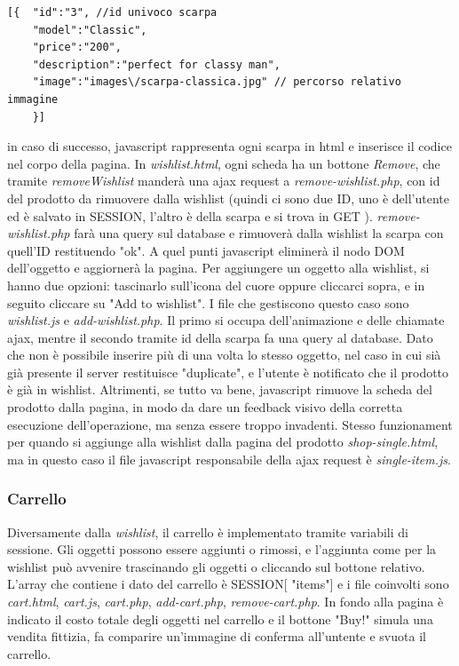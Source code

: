 \documentclass[a4paper,12pt]{article}
\begin{document}
\begin{lstlisting}
[{	"id":"3", //id univoco scarpa
	"model":"Classic",
	"price":"200",
	"description":"perfect for classy man",
	"image":"images\/scarpa-classica.jpg" // percorso relativo immagine
	}]
\end{lstlisting}
in caso di successo, javascript rappresenta ogni scarpa in html e inserisce il codice
 nel corpo della pagina.
In \textit{wishlist.html}, ogni scheda ha un bottone \textit{Remove}, 
 che tramite  \textit{removeWishlist} manderà una ajax request a \textit{remove-wishlist.php},
 con id del prodotto da rimuovere dalla wishlist (quindi ci sono due ID, uno è dell'utente 
 ed è salvato in \textdollar\textunderscore SESSION, l'altro è della scarpa e si trova in \textdollar\textunderscore GET ).
 \textit{remove-wishlist.php} farà una query sul database e rimuoverà dalla wishlist la scarpa con 
 quell'ID restituendo "ok". A quel punti javascript eliminerà il nodo DOM dell'oggetto
 e aggiornerà la pagina.
Per aggiungere un oggetto alla wishlist, si hanno due opzioni: tascinarlo sull'icona del cuore 
oppure cliccarci sopra, e in seguito cliccare su "Add to wishlist".
I file che gestiscono questo caso sono \textit{wishlist.js} e \textit{add-wishlist.php}.
Il primo si occupa dell'animazione e delle chiamate ajax, mentre il secondo tramite id della scarpa
fa una query al database. Dato che non è possibile inserire più di una volta lo stesso
oggetto, nel caso in cui sià già presente il server restituisce "duplicate", e l'utente è
notificato che il prodotto è già in wishlist. Altrimenti, se tutto va bene, javascript
rimuove la scheda del prodotto dalla pagina, in modo da dare un feedback visivo 
della corretta esecuzione dell'operazione, ma senza essere troppo invadenti.
Stesso funzionament per quando si aggiunge alla wishlist dalla pagina del prodotto
\textit{shop-single.html}, ma in questo caso il file javascript responsabile della ajax request è 
\textit{single-item.js}. 
\subsubsection{Carrello}
Diversamente dalla \textit{wishlist}, il carrello è implementato tramite variabili di sessione.
Gli oggetti possono essere aggiunti o rimossi, e l'aggiunta come per la wishlist può avvenire trascinando
gli oggetti o cliccando sul bottone relativo. 
L'array che contiene i dato del carrello è \textdollar\textunderscore SESSION[ "items"] e i file coinvolti sono
\textit{cart.html}, \textit{cart.js}, \textit{cart.php}, \textit{add-cart.php}, \textit{remove-cart.php}.
 In fondo alla pagina  è indicato il costo totale degli oggetti nel carrello e il bottone "Buy!" simula una
 vendita fittizia, fa comparire un'immagine di conferma all'untente e svuota il carrello.
\end{document}
